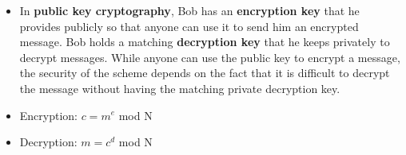 \documentclass[12pt,a4paper]{article}
\begin{document}
\begin{enumerate}
  \begin{itemize}
    \item In \textbf{public key cryptography}, Bob has an \textbf{encryption key} that he provides publicly so that anyone can use it to send him an encrypted message. Bob holds a matching \textbf{decryption key} that he keeps privately to decrypt messages. While anyone can use the public key to encrypt a message, the security of the scheme depends on the fact that it is difficult to decrypt the message without having the matching private decryption key. 
    \item Encryption: \(c = m^e\) mod N
    \item Decryption: \(m = c^d\) mod N
  \end{itemize}
\end{enumerate}
\end{document}
